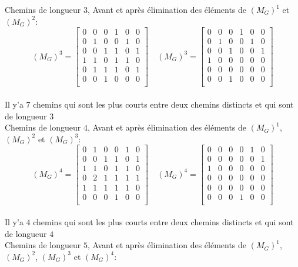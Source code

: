 \begin{enumerate}[\rm 1)]
\begin{framed}
Chemins de longueur $3$, Avant et après élimination des éléments de $(M_G)^1$ et $(M_G)^2$:\\
\[(M_G)^3=
\begin{bmatrix}
 0&0 &0&1&0&0\\
 0&1 &0&0&1&0\\
 0&0 &1&1&0&1\\
 1&1 &0&1&1&0\\
 0&1 &1&1&0&1\\
 0&0 &1&0&0&0\\
\end{bmatrix}
\quad (M_G)^3= 
\begin{bmatrix}
 0&0 &0&1&0&0\\
 0&1 &0&0&1&0\\
 0&0 &1&0&0&1\\
 1&0 &0&0&0&0\\
 0&0 &0&0&0&0\\
 0&0 &1&0&0&0\\
\end{bmatrix}
\]
\\
Il y'a $7$ chemins qui sont les plus courts entre deux chemins distincts et qui sont de longueur $3$ \\
Chemins de longueur $4$, Avant et après élimination des éléments de $(M_G)^1$, $(M_G)^2$ et $(M_G)^3$:\\
\[(M_G)^4=
\begin{bmatrix}
 0&1 &0&0&1&0\\
 0&0 &1&1&0&1\\
 1&1 &0&1&1&0\\
 0&2 &1&1&1&1\\
 1&1 &1&1&1&0\\
 0&0 &0&1&0&0\\
\end{bmatrix}
\quad (M_G)^4= 
\begin{bmatrix}
 0&0 &0&0&1&0\\
 0&0 &0&0&0&1\\
 1&0 &0&0&0&0\\
 0&0 &0&0&0&0\\
 0&0 &0&0&0&0\\
 0&0 &0&1&0&0\\
\end{bmatrix}
\]
\\
Il y'a $4$ chemins qui sont les plus courts entre deux chemins distincts et qui sont de longueur $4$ \\
Chemins de longueur $5$, Avant et après élimination des éléments de $(M_G)^1$, $(M_G)^2$, $(M_G)^3$ et $(M_G)^4$:\\

\end{framed}
\end{enumerate}
